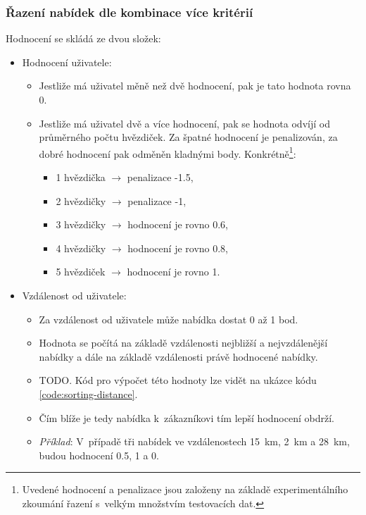 \subsubsection{Řazení nabídek dle kombinace více kritérií}
Hodnocení se skládá ze dvou složek:
\begin{itemize}
	\item Hodnocení uživatele:
        \begin{itemize}
            \item Jestliže má uživatel měně než dvě hodnocení, pak je tato hodnota rovna 0.
            \item Jestliže má uživatel dvě a více hodnocení, pak se hodnota odvíjí od průměrného počtu hvězdiček. Za špatné hodnocení je penalizován, za dobré hodnocení pak odměněn kladnými body. Konkrétně\footnote{Uvedené hodnocení a penalizace jsou založeny na základě experimentálního zkoumání řazení s~velkým množstvím testovacích dat.}:
            \begin{itemize}
                \item 1 hvězdička $\rightarrow$ penalizace -1.5,
                \item 2 hvězdičky $\rightarrow$ penalizace -1,
                \item 3 hvězdičky $\rightarrow$ hodnocení je rovno 0.6,
                \item 4 hvězdičky $\rightarrow$ hodnocení je rovno 0.8,
                \item 5 hvězdiček $\rightarrow$ hodnocení je rovno 1.
            \end{itemize}
        \end{itemize}
	\item Vzdálenost od uživatele:
        \begin{itemize}
            \item Za vzdálenost od uživatele může nabídka dostat 0 až 1 bod.
            \item Hodnota se počítá na základě vzdálenosti nejbližší a nejvzdálenější nabídky a dále na základě vzdálenosti právě hodnocené nabídky.
            \item TODO. Kód pro výpočet této hodnoty lze vidět na ukázce kódu \ref{code:sorting-distance}.
            \item Čím blíže je tedy nabídka k~zákazníkovi tím lepší hodnocení obdrží.
            \item \textit{Příklad}: V~případě tři nabídek ve vzdálenostech 15~km, 2~km a 28~km, budou hodnocení 0.5, 1 a 0.
        \end{itemize}
\end{itemize}

